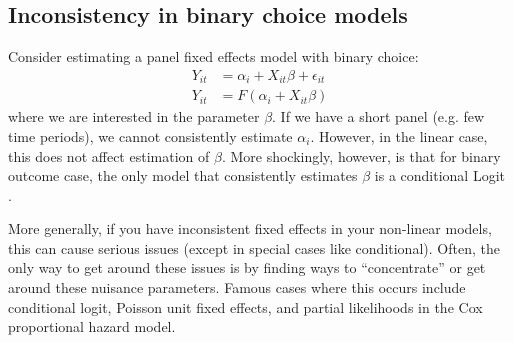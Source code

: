 \documentclass{tufte-handout}
\theoremstyle{break}
\begin{document}
\subsection{Inconsistency in binary choice models}
Consider estimating a panel fixed effects model with binary choice:
 \begin{align*}
 Y_{it} &= \alpha_{i} + X_{it}\beta + \epsilon_{it}\\
 Y_{it} &= F(\alpha_{i} + X_{it}\beta)
 \end{align*}
 where we are interested in the parameter $\beta$. If we have a short panel (e.g. few time periods), we cannot consistently estimate $\alpha_{i}$. However, in the linear case, this does not affect estimation of $\beta$. More shockingly, however, is that for binary outcome case, the only model that consistently estimates $\beta$ is a conditional Logit \citep{chamberlain1980analysis, chamberlain2010binary}. 
 
More generally, if you have inconsistent fixed effects in your non-linear models, this can cause serious issues (except in special cases like conditional). Often, the only way to get around these issues is by finding ways to ``concentrate'' or get around these nuisance parameters. Famous cases where this occurs include conditional logit, Poisson unit fixed effects, and partial likelihoods in the Cox proportional hazard model. 

\end{document}
